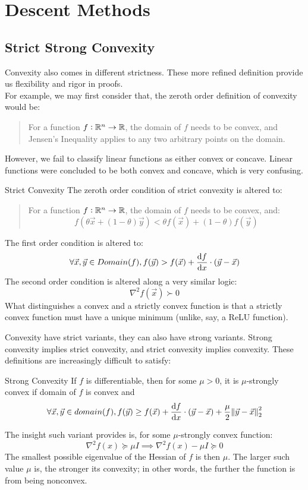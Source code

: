 \chapter{Descent Methods}

\section{Strict Strong Convexity}
Convexity also comes in different strictness. These more refined definition provide us flexibility and rigor in proofs. \\
For example, we may first consider that, the zeroth order definition of convexity would be:
\begin{quote}
    For a function $f: \R^n \rightarrow \R$, the domain of $f$ needs to be convex, and Jensen's Inequality applies to any two arbitrary points on the domain.
\end{quote}
However, we fail to classify linear functions as either convex or concave. Linear functions were concluded to be both convex and concave, which is very confusing.
\begin{ln-define}{Strict Convexity}{}
    The zeroth order condition of strict convexity is altered to:
    \begin{quote}
        For a function $f: \R^n \rightarrow \R$, the domain of $f$ needs to be convex, and:
        \[
            f(\theta \vec{x} + (1 - \theta) \vec{y}) < \theta f(\vec{x}) + (1 - \theta) f(\vec{y})
        \]
    \end{quote}
    The first order condition is altered to:
    \[
        \forall \vec{x}, \vec{y} \in Domain(f), f(\vec{y}) > f(\vec{x}) + \dv{f}{x} \cdot (\vec{y} - \vec{x})
    \]
    The second order condition is altered along a very similar logic:
    \[
        \nabla^2 f(\vec{x}) \succ 0
    \]
    What distinguishes a convex and a strictly convex function is that a strictly convex function must have a unique minimum (unlike, say, a ReLU function).
\end{ln-define}

Convexity have strict variants, they can also have strong variants.
Strong convexity implies strict convexity, and strict convexity implies convexity. These definitions are increasingly difficult to satisfy:
\begin{ln-define}{Strong Convexity}{}
    If $f$ is differentiable, then for some $\mu > 0$, it is $\mu$-strongly convex if domain of $f$ is convex and
    \[
        \forall \vec{x}, \vec{y} \in domain(f), f(\vec{y}) \geq f(\vec{x}) + \dv{f}{x} \cdot (\vec{y} - \vec{x}) + \frac{\mu}{2} \pnorm[2]{\vec{y} - \vec{x}}{2}
    \]
\end{ln-define}
The insight such variant provides is, for some $\mu$-strongly convex function:
\[
    \nabla^2 f(x) \succcurlyeq \mu I \implies \nabla^2 f(x) - \mu I \succcurlyeq 0
\]
The smallest possible eigenvalue of the Hessian of $f$ is then $\mu$.
The larger such value $\mu$ is, the stronger its convexity; in other words, the further the function is from being nonconvex.

